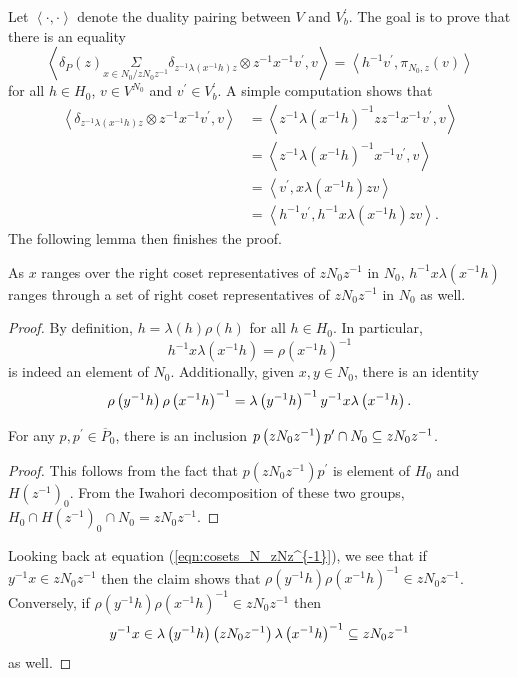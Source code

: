 \documentclass[10pt]{amsart}
\begin{document}
Let $\left<\cdot,\cdot\right>$ denote the duality pairing between $V$ and $V^{\prime}_{b}$. The goal is to prove that there is an equality \[
    \left<\delta_{P}(z)\underset{x\in N_{0}/zN_{0}z^{-1}}{\Sigma} \delta_{z^{-1}\lambda(x^{-1}h)z}\otimes z^{-1}x^{-1}v^{\prime},v\right>=\left<h^{-1}v^{\prime},\pi_{N_{0},z}(v)\right>
\] for all $h\in H_{0}$, $v\in V^{N_{0}}$ and $v^{\prime}\in V^{\prime}_{b}$. A simple computation shows that \begin{equation}
\begin{split}
    \left\langle \delta_{z^{-1}\lambda\left(x^{-1}h\right)z}\otimes z^{-1}x^{-1}v^{\prime},v\right\rangle &= \left\langle z^{-1}\lambda(x^{-1}h)^{-1}zz^{-1}x^{-1}v^{\prime},v\right\rangle \\
	&=	\left\langle z^{-1}\lambda(x^{-1}h)^{-1}x^{-1}v^{\prime},v\right\rangle \\ 
	&=	\left\langle v^{\prime},x\lambda(x^{-1}h)zv\right\rangle \\
	&=	\left\langle h^{-1}v^{\prime},h^{-1}x\lambda(x^{-1}h)zv\right\rangle .
\end{split}
\end{equation} The following lemma then finishes the proof. 

\begin{lemma}
As $x$ ranges over the right coset representatives of $zN_{0}z^{-1}$ in $N_{0}$, $h^{-1}x\lambda(x^{-1}h)$ ranges through a set of right coset representatives of $zN_{0}z^{-1}$ in $N_{0}$ as well.
\end{lemma}
\begin{proof}
By definition, $h=\lambda(h)\rho(h)$ for all $h\in H_{0}$. In particular, \[        
    h^{-1}x\lambda\left(x^{-1}h\right)=\rho\left(x^{-1}h\right)^{-1}
\] is indeed an element of $N_{0}$. Additionally, given $x,y\in N_{0}$, there is an identity \begin{equation}\label{eqn:cosets_N_zNz^{-1}}
    \rho\left(y^{-1}h\right)\rho\left(x^{-1}h\right)^{-1}=\lambda\left(y^{-1}h\right)^{-1}y^{-1}x\lambda\left(x^{-1}h\right).
\end{equation}
\begin{claim}
For any $p,p^{\prime}\in\overline{P}_{0}$, there is an inclusion $p\left(zN_{0}z^{-1}\right)p^{\prime}\cap N_{0}\subseteq zN_{0}z^{-1}$.
\end{claim}
\begin{proof}
This follows from the fact that $p\left(zN_{0}z^{-1}\right)p^{\prime}$ is element of $H_{0}$ and $H(z^{-1})_{0}$. From the Iwahori decomposition of these two groups, $H_{0}\cap H(z^{-1})_{0}\cap N_{0}=zN_{0}z^{-1}$.
\end{proof}

Looking back at equation (\ref{eqn:cosets_N_zNz^{-1}}), we see that if $y^{-1}x\in zN_{0}z^{-1}$ then the claim shows that $\rho\left(y^{-1}h\right)\rho\left(x^{-1}h\right)^{-1}\in zN_{0}z^{-1}$. Conversely, if $\rho\left(y^{-1}h\right)\rho\left(x^{-1}h\right)^{-1}\in zN_{0}z^{-1}$ then \[
    y^{-1}x\in\lambda\left(y^{-1}h\right)\left(zN_{0}z^{-1}\right)\lambda\left(x^{-1}h\right)^{-1}\subseteq zN_{0}z^{-1}
\] as well.
\end{proof}
\end{document}
